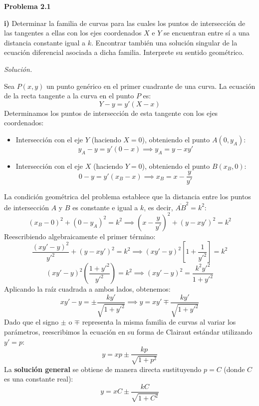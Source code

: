 \documentclass[12pt,letterpaper]{article}
\begin{document}
\textbf{Problema 2.1}

\medskip
\textbf{i)} Determinar la familia de curvas para las cuales los puntos de intersección de las tangentes a ellas con los ejes coordenados $X$ e $Y$ se encuentran entre sí a una distancia constante igual a $k$. Encontrar también una solución singular de la ecuación diferencial asociada a dicha familia. Interprete su sentido geométrico.

\medskip
\textit{Solución.}

Sea $P(x, y)$ un punto genérico en el primer cuadrante de una curva. La ecuación de la recta tangente a la curva en el punto $P$ es:
\[
  Y - y = y'(X - x)
\]
Determinamos los puntos de intersección de esta tangente con los ejes coordenados:
\begin{itemize}
  \item Intersección con el eje $Y$ (haciendo $X = 0$), obteniendo el punto $A(0, y_A)$:
  \[
    y_A - y = y'(0 - x) \implies y_A = y - x y'
  \]
  \item Intersección con el eje $X$ (haciendo $Y = 0$), obteniendo el punto $B(x_B, 0)$:
  \[
    0 - y = y'(x_B - x) \implies x_B = x - \frac{y}{y'}
  \]
\end{itemize}
La condición geométrica del problema establece que la distancia entre los puntos de intersección $A$ y $B$ es constante e igual a $k$, es decir, $\overline{AB}^2 = k^2$:
\[
  (x_B - 0)^2 + (0 - y_A)^2 = k^2 \implies \left( x - \frac{y}{y'} \right)^2 + (y - x y')^2 = k^2
\]
Reescribiendo algebraicamente el primer término:
\[
  \frac{(x y' - y)^2}{y'^2} + (y - x y')^2 = k^2 \implies (x y' - y)^2 \left[ 1 + \frac{1}{y'^2} \right] = k^2
\]
\[
  (x y' - y)^2 \left( \frac{1 + y'^2}{y'^2} \right) = k^2 \implies (x y' - y)^2 = \frac{k^2 y'^2}{1 + y'^2}
\]
Aplicando la raíz cuadrada a ambos lados, obtenemos:
\[
  x y' - y = \pm \frac{k y'}{\sqrt{1 + y'^2}} \implies y = x y' \mp \frac{k y'}{\sqrt{1 + y'^2}}
\]
Dado que el signo $\pm$ o $\mp$ representa la misma familia de curvas al variar los parámetros, reescribimos la ecuación en su forma de Clairaut estándar utilizando $y' = p$:
\[
  y = x p \pm \frac{k p}{\sqrt{1 + p^2}}
\]
La \textbf{solución general} se obtiene de manera directa sustituyendo $p = C$ (donde $C$ es una constante real):
\[
  y = x C \pm \frac{k C}{\sqrt{1 + C^2}}
\]
\end{document}
